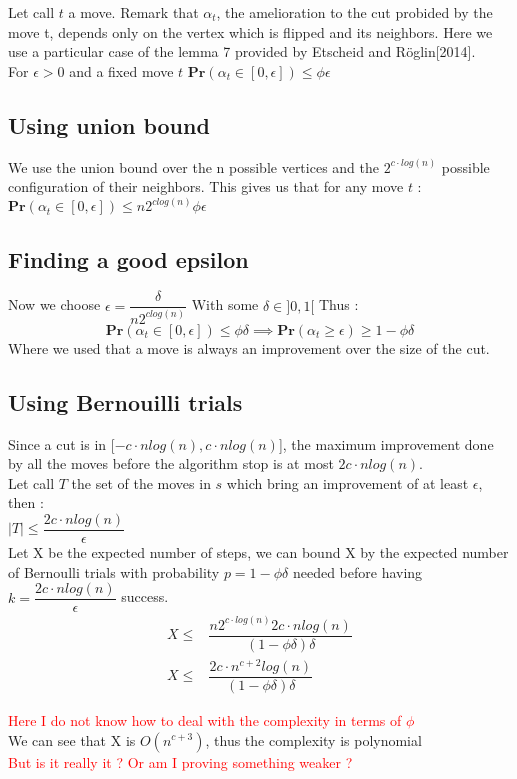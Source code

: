 \documentclass[12pt]{article}
\begin{document}
Let call $t$ a move. Remark that $\alpha_t$, the amelioration to the cut probided by the move t, depends only on the vertex which is flipped and its neighbors. 
Here we use a particular case of the lemma 7 provided by Etscheid and Röglin[2014]. \\ 
For $\epsilon > 0$ and a fixed move $t$ $\mathbf{Pr}(\alpha_t \in [0,\epsilon]) \leq \phi \epsilon$ \\

\subsection{Using union bound}

We use the union bound over the n possible vertices and the $2^{c \cdot log(n)}$ possible configuration of their neighbors. This gives us that for any move $t$ : \\
 $\mathbf{Pr}(\alpha_t \in [0,\epsilon]) \leq n2^{clog(n)}\phi \epsilon$ \\
 
 \subsection{Finding a good epsilon}
 Now we choose $\epsilon = \dfrac{\delta}{n2^{clog(n)}}$ With some $\delta \in ]0,1[$ Thus :\\
 \begin{equation}
 \mathbf{Pr}(\alpha_t \in [0,\epsilon]) \leq \phi \delta \implies  \mathbf{Pr}(\alpha_t \geq \epsilon) \geq 1 - \phi \delta
 \end{equation}
Where we used that a move is always an improvement over the size of the cut.

\subsection{Using Bernouilli trials}

Since a cut is in [$-c\cdot nlog(n), c \cdot nlog(n)$], the maximum improvement done by all the moves before the algorithm stop is at most $2c\cdot nlog(n)$. \\
Let call $T$ the set of the moves in $s$ which bring an improvement of at least $\epsilon$, then : \\
 $|T| \leq \dfrac{2c\cdot nlog(n)}{\epsilon}$ \\
 Let X be the expected number of steps, we can bound X by the expected number of Bernoulli trials with probability $p = 1 - \phi \delta$ needed before having  $k = \dfrac{2c\cdot nlog(n)}{\epsilon}$ success. \\
 \begin{equation}
 \begin{split}
X \leq &\dfrac{n2^{c \cdot log(n)} 2c \cdot nlog(n)}{(1 - \phi \delta) \delta}\\
X \leq &\dfrac{2c \cdot n^{c+2} log(n)}{(1 - \phi \delta) \delta}
\end{split}
\end{equation}

\textcolor{red}{Here I do not know how to deal with the complexity in terms of $\phi$}\\
We can see that X is $O(n^{c+3})$, thus the complexity is polynomial \\
\textcolor{red}{But is it really it ? Or am I proving something weaker ?}
\end{document}
